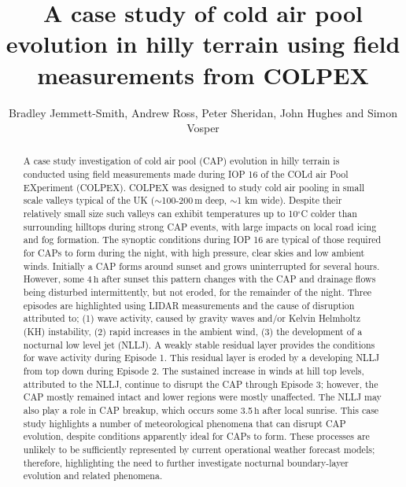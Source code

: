 \documentclass[times]{qjrms4}
\begin{document}

\title{A case study of cold air pool evolution in hilly terrain using field measurements from COLPEX}

\author{Bradley Jemmett-Smith\corrauth, Andrew Ross, Peter Sheridan, John Hughes and Simon Vosper}

\address{ University of Leeds, Leeds, UK  Met Office, Exeter, UK}


\begin{abstract}
A case study investigation of cold air pool (CAP) evolution in hilly terrain is conducted using field measurements made during IOP 16 of the COLd air Pool EXperiment (COLPEX). COLPEX was designed to study cold air pooling in small scale valleys typical of the UK ($\sim$100-200$\,\mbox{m}$ deep, $\sim$1 km wide). Despite their relatively small size such valleys can exhibit temperatures up to 10$^\circ$C colder than surrounding hilltops during strong CAP events, with large impacts on local road icing and fog formation. The synoptic conditions during IOP 16 are typical of those required for CAPs to form during the night, with high pressure, clear skies and low ambient winds. Initially a CAP forms around sunset and grows uninterrupted for several hours. However, some 4$\,\mbox{h}$ after sunset this pattern changes with the CAP and drainage flows being disturbed intermittently, but not eroded, for the remainder of the night. Three episodes are highlighted using LIDAR measurements and the cause of disruption attributed to; (1) wave activity, caused by gravity waves and/or Kelvin Helmholtz (KH) instability, (2) rapid increases in the ambient wind, (3) the development of a nocturnal low level jet (NLLJ). A weakly stable residual layer provides the conditions for wave activity during Episode 1. This residual layer is eroded by a developing NLLJ from top down during Episode 2. The sustained increase in winds at hill top levels, attributed to the NLLJ, continue to disrupt the CAP through Episode 3; however, the CAP mostly remained intact and lower regions were mostly unaffected. The NLLJ may also play a role in CAP breakup, which occurs some 3.5$\,\mbox{h}$ after local sunrise. This case study highlights a number of meteorological phenomena that can disrupt CAP evolution, despite conditions apparently ideal for CAPs to form. These processes are unlikely to be sufficiently represented by current operational weather forecast models; therefore, highlighting the need to further investigate nocturnal boundary-layer evolution and related phenomena.
\end{abstract}
\end{document}
